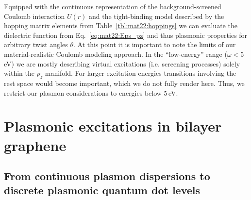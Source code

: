 Equipped with the continuous representation of the background-screened Coulomb interaction $U(r)$ and the tight-binding model described by the hopping matrix elements from Table~\ref{tbl:mat22:hoppings} we can evaluate the dielectric function from Eq.~\eqref{eq:mat22:Eps_pz} and thus plasmonic properties for arbitrary twist angles $\theta$.  At this point it is important to note the limits of our material-realistic Coulomb modeling approach. In the ``low-energy'' range ($\omega < 5\,$eV) we are mostly describing virtual excitations (i.e. screening processes) solely within the $p_z$ manifold. For larger excitation energies transitions involving the rest space would become important, which we do not fully render here. Thus, we restrict our plasmon considerations to energies below $5\,$eV.


\section{Plasmonic excitations in bilayer graphene}

\subsection{From continuous plasmon dispersions to discrete plasmonic quantum dot levels}\label{sec:mat22:from-continuous-plasmon}
        
